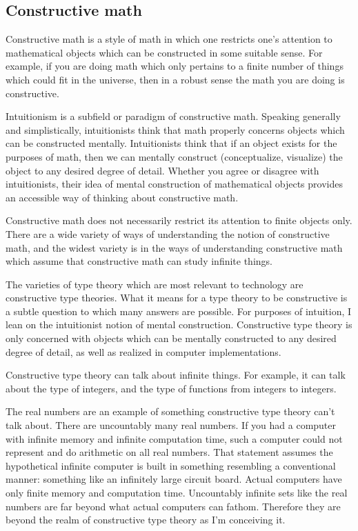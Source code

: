 \documentclass{article}
\begin{document}
\subsection{Constructive math}

Constructive math is a style of math in which one restricts one's attention to mathematical objects which can be constructed in some suitable sense. For example, if you are doing math which only pertains to a finite number of things which could fit in the universe, then in a robust sense the math you are doing is constructive.

Intuitionism is a subfield or paradigm of constructive math. Speaking generally and simplistically, intuitionists think that math properly concerns objects which can be constructed mentally. Intuitionists think that if an object exists for the purposes of math, then we can mentally construct (conceptualize, visualize) the object to any desired degree of detail. Whether you agree or disagree with intuitionists, their idea of mental construction of mathematical objects provides an accessible way of thinking about constructive math.

Constructive math does not necessarily restrict its attention to finite objects only. There are a wide variety of ways of understanding the notion of constructive math, and the widest variety is in the ways of understanding constructive math which assume that constructive math can study infinite things.

The varieties of type theory which are most relevant to technology are constructive type theories. What it means for a type theory to be constructive is a subtle question to which many answers are possible. For purposes of intuition, I lean on the intuitionist notion of mental construction. Constructive type theory is only concerned with objects which can be mentally constructed to any desired degree of detail, as well as realized in computer implementations.

Constructive type theory can talk about infinite things. For example, it can talk about the type of integers, and the type of functions from integers to integers.

The real numbers are an example of something constructive type theory can’t talk about. There are uncountably many real numbers. If you had a computer with infinite memory and infinite computation time, such a computer could not represent and do arithmetic on all real numbers. That statement assumes the hypothetical infinite computer is built in something resembling a conventional manner: something like an infinitely large circuit board. Actual computers have only finite memory and computation time. Uncountably infinite sets like the real numbers are far beyond what actual computers can fathom. Therefore they are beyond the realm of constructive type theory as I’m conceiving it.
\end{document}
